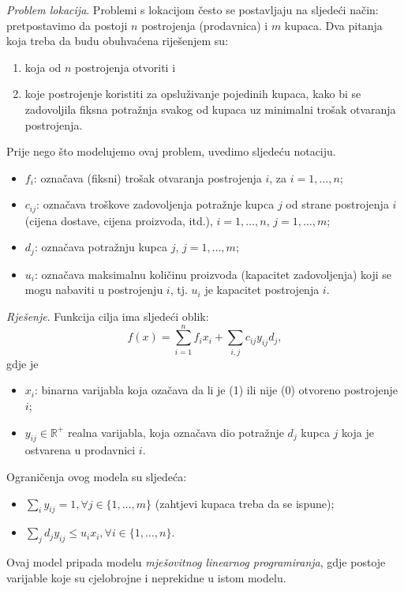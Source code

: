 \documentclass[a4paper, utf8, 11pt, colorlinks]{book}
\begin{document}
\emph{Problem lokacija}. Problemi s lokacijom često se postavljaju na sljedeći način: pretpostavimo da postoji $n$ postrojenja (prodavnica)  i  $m$ kupaca. Dva pitanja koja treba da budu obuhvaćena riješenjem su:
\begin{enumerate}
	\item koja od $n$ postrojenja otvoriti i
	\item koje  postrojenje koristiti za opsluživanje pojedinih kupaca, kako bi se zadovoljila fiksna potražnja svakog od kupaca uz minimalni trošak otvaranja postrojenja.
\end{enumerate}
Prije nego što modelujemo ovaj problem, uvedimo sljedeću notaciju.
\begin{itemize}
	\item  $f_{i}$: označava (fiksni) trošak otvaranja postrojenja $i$, za  $ i = 1,  \ldots, n$;
	\item $c_{ij}$: označava troškove zadovoljenja potražnje  kupca $j$ od strane postrojenja $i$ (cijena dostave, cijena proizvoda,  itd.), $i = 1, \ldots, n$, $j = 1,  \ldots, m$;
	\item $d_{j}$: označava potražnju kupca $j$, $j = 1, \ldots, m$;
	\item $u_{i}$: označava maksimalnu količinu proizvoda (kapacitet zadovoljenja) koji se mogu nabaviti u postrojenju $i$, tj. $u_{i}$ je kapacitet postrojenja $i$.
\end{itemize}

\emph{Rješenje}. Funkcija cilja ima sljedeći oblik:
$$ f(x) = \sum_{i=1}^n f_i x_i  + \sum_{i,j} c_{ij} y_{ij} d_j,$$
gdje je
\begin{itemize}
	\item $x_i$: binarna varijabla koja ozačava da li je (1) ili nije (0) otvoreno postrojenje $i$;
	\item $y_{ij} \in \mathbb{R}^+$ realna varijabla, koja označava dio potražnje $d_j$ kupca $j$ koja je ostvarena u prodavnici $i$.
\end{itemize}
Ograničenja ovog modela su sljedeća:
\begin{itemize}
	\item $\sum_{i} y_{ij} = 1, \forall j\in\{1,\ldots,m\}$ (zahtjevi kupaca treba da se ispune);
	\item $\sum_{j} d_j y_{ij} \leq u_i x_i, \forall i \in \{1,\ldots,n\}$.
\end{itemize}
Ovaj model pripada modelu \emph{mješovitnog linearnog programiranja}, gdje postoje varijable koje su cjelobrojne i neprekidne u istom modelu.
\end{document}
